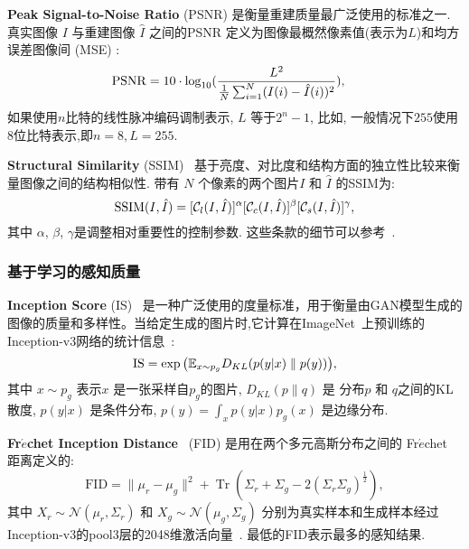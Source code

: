 \vspace{1mm}
\noindent\textbf{Peak Signal-to-Noise Ratio} (PSNR) 是衡量重建质量最广泛使用的标准之一.
真实图像 $I$ 与重建图像 $\hat{I}$ 之间的PSNR 定义为图像最概然像素值(表示为$L$)和均方误差图像间 (MSE) :
\begin{align}
{\rm PSNR} &= 10 \cdot \log_{10} (\frac {L^2} {\frac{1}{N} \sum_{i=1}^{N} (I(i) - \hat{I}(i))^2}),
\label{eqn:mse}
\end{align}
如果使用$n$比特的线性脉冲编码调制表示, $L$ 等于$2^{n}-1$, 比如, 一般情况下$255$使用8位比特表示,即$n=8,L=255$.

\vspace{1mm}
\noindent\textbf{Structural Similarity} (SSIM)~\cite{TIP2004ImageWang} 基于亮度、对比度和结构方面的独立性比较来衡量图像之间的结构相似性.
带有 $N$ 个像素的两个图片$I$ 和 $\hat{I}$ 的SSIM为:
\begin{equation}
\label{eqn:ssim}
{\rm SSIM}(I, \hat{I}) = [\mathcal{C}_l(I, \hat{I})]^\alpha
                         [\mathcal{C}_c(I, \hat{I})]^\beta
                         [\mathcal{C}_s(I, \hat{I})]^\gamma,
\end{equation}
其中 $\alpha$, $\beta$, $\gamma$是调整相对重要性的控制参数.
这些条款的细节可以参考~\cite{TIP2004ImageWang}.






\subsubsection{基于学习的感知质量}
\noindent\textbf{Inception Score} (IS)~\cite{salimans2016improved} 是一种广泛使用的度量标准，用于衡量由GAN模型生成的图像的质量和多样性。当给定生成的图片时,它计算在ImageNet~\cite{deng2009imagenet}上预训练的Inception-v3网络的统计信息~\cite{szegedy2016rethinking}:
\begin{equation}
\mathrm{IS} = \exp{\big (\mathbb{E}_{x \sim p_g} D_{KL} (p(y|x) \;\|\; p(y))\big)},
\end{equation}
其中 $x \sim p_g$ 表示$x$ 是一张采样自$p_g$的图片, $D_{KL}(p\|q)$ 是 分布$p$ 和 $q$之间的KL散度, $p(y|x)$ 是条件分布, $p(y) = \int_x p(y|x)p_g(x)$ 是边缘分布.\par

\vspace{1mm}
\noindent\textbf{Fr$\acute{e}$chet Inception Distance}~\cite{heusel2017gans} (FID) 是用在两个多元高斯分布之间的 Fr$\acute{e}$chet 距离定义的:
\begin{equation}
\mathrm{FID}=\|\mu_{r}-\mu_{g}\|^{2}+\operatorname{Tr}(\Sigma_{r}+\Sigma_{g}-2(\Sigma_{r} \Sigma_{g})^{\frac{1}{2}}),
\end{equation}
其中 $X_{r} \sim \mathcal{N}(\mu_{r}, \Sigma_{r})$ 和 $X_{g} \sim \mathcal{N}(\mu_{g}, \Sigma_{g})$ 分别为真实样本和生成样本经过Inception-v3的pool3层的2048维激活向量~\cite{szegedy2016rethinking}. 
最低的FID表示最多的感知结果.\par

